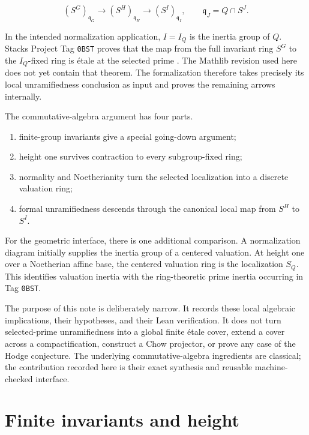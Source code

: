 \documentclass[11pt]{article}
\theoremstyle{remark}
\newcommand{\q}{\mathfrak q}
\begin{document}
\[
  (S^G)_{\q_G}\longrightarrow
  (S^H)_{\q_H}\longrightarrow
  (S^I)_{\q_I},
  \qquad \q_J=Q\cap S^J.
\]

In the intended normalization application, \(I=I_Q\) is the inertia
group of \(Q\).  Stacks Project Tag \texttt{0BST} proves that the map from
the full invariant ring \(S^G\) to the \(I_Q\)-fixed ring is
\'etale at the selected prime \cite{StacksPrimeInertiaEtale}.  The Mathlib
revision used here does not yet contain that theorem.  The formalization
therefore takes precisely its local unramifiedness conclusion as input and
proves the remaining arrows internally.

The commutative-algebra argument has four parts.

\begin{enumerate}[label=\textup{(\roman*)},leftmargin=2.6em]
  \item finite-group invariants give a special going-down argument;
  \item height one survives contraction to every subgroup-fixed ring;
  \item normality and Noetherianity turn the selected localization into a
        discrete valuation ring;
  \item formal unramifiedness descends through the canonical local map
        from \(S^H\) to \(S^I\).
\end{enumerate}

For the geometric interface, there is one additional comparison.  A
normalization diagram initially supplies the inertia group of a centered
valuation.  At height one over a Noetherian affine base, the centered
valuation ring is the localization \(S_Q\).  This identifies valuation
inertia with the ring-theoretic prime inertia occurring in
Tag \texttt{0BST}.

The purpose of this note is deliberately narrow.  It records these local
algebraic implications, their hypotheses, and their Lean verification.  It
does not turn selected-prime unramifiedness into a global finite
\'etale cover, extend a cover across a compactification, construct
a Chow projector, or prove any case of the Hodge conjecture.  The underlying
commutative-algebra ingredients are classical; the contribution recorded
here is their exact synthesis and reusable machine-checked interface.

\section{Finite invariants and height}
\label{sec:height}
\end{document}
